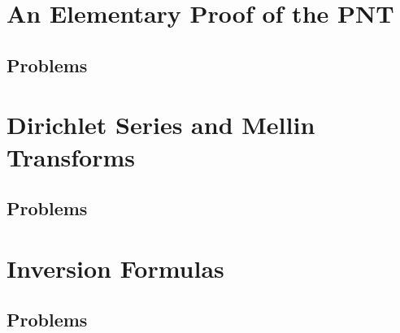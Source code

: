 \documentclass[12pt]{amsbook}
\begin{document}
\chapter{An Elementary Proof of the PNT}



\section{Problems}











\chapter{Dirichlet Series and Mellin Transforms}

\newcommand{\Fhat}{\widehat{F}}
\newcommand{\cconj}[1]{\overline{#1}}



\section{Problems}



















\chapter{Inversion Formulas}

\newcommand{\Ghat}{\widehat{G}}



\section{Problems}
















\end{document}

